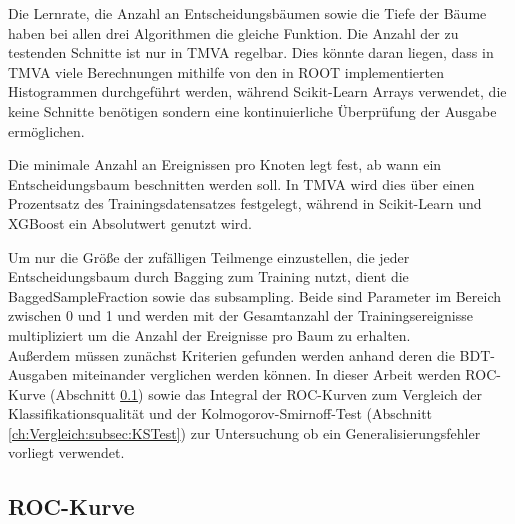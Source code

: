 Die Lernrate, die Anzahl an Entscheidungsb\"aumen sowie die Tiefe der B\"aume haben bei allen drei Algorithmen die gleiche Funktion. Die Anzahl der zu testenden Schnitte ist nur in TMVA regelbar. Dies k\"onnte daran liegen, dass in TMVA viele Berechnungen mithilfe von den in ROOT implementierten Histogrammen durchgef\"uhrt werden, w\"ahrend Scikit-Learn Arrays verwendet, die keine Schnitte ben\"otigen sondern eine kontinuierliche \"Uberpr\"ufung der Ausgabe erm\"oglichen. 

Die minimale Anzahl an Ereignissen pro Knoten legt fest, ab wann ein Entscheidungsbaum beschnitten werden soll. In TMVA wird dies \"uber einen Prozentsatz des Trainingsdatensatzes festgelegt, w\"ahrend in Scikit-Learn und XGBoost ein Absolutwert genutzt wird.

Um nur die Gr\"o\ss e der zuf\"alligen Teilmenge einzustellen, die jeder Entscheidungsbaum durch Bagging zum Training nutzt, dient die BaggedSampleFraction sowie das subsampling. Beide sind Parameter im Bereich zwischen 0 und 1 und werden mit der Gesamtanzahl der Trainingsereignisse multipliziert um die Anzahl der Ereignisse pro Baum zu erhalten.\\

Au\ss erdem m\"ussen zun\"achst Kriterien gefunden werden anhand deren die BDT-Ausgaben miteinander verglichen werden k\"onnen. In dieser Arbeit werden ROC-Kurve (Abschnitt \ref{ch:Vergleich:subsec:ROC}) sowie das Integral der ROC-Kurven zum Vergleich der Klassifikationsqualit\"at und der Kolmogorov-Smirnoff-Test (Abschnitt \ref{ch:Vergleich:subsec:KSTest}) zur Untersuchung ob ein Generalisierungsfehler vorliegt verwendet.

\subsection{ROC-Kurve}
\label{ch:Vergleich:subsec:ROC}

